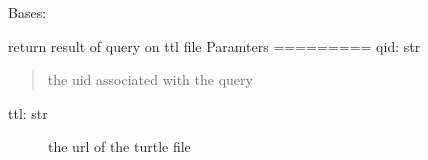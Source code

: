 \documentclass[letterpaper,10pt,english]{sphinxmanual}
\begin{document}
\begin{fulllineitems}
\label{nidm:nidm.app.apiDoQuery}
Bases: 

return result of query on ttl file
Paramters
=========
qid: str
\begin{quote}

the uid associated with the query
\end{quote}
\begin{description}
\item[{ttl: str}] \leavevmode
the url of the turtle file

\end{description}

\begin{fulllineitems}
\label{nidm:nidm.app.apiDoQuery.endpoint}
\end{fulllineitems}


\begin{fulllineitems}
\label{nidm:nidm.app.apiDoQuery.get}
\end{fulllineitems}


\begin{fulllineitems}
\label{nidm:nidm.app.apiDoQuery.mediatypes}
\end{fulllineitems}


\begin{fulllineitems}
\label{nidm:nidm.app.apiDoQuery.methods}
\end{fulllineitems}


\end{fulllineitems}

\end{document}
